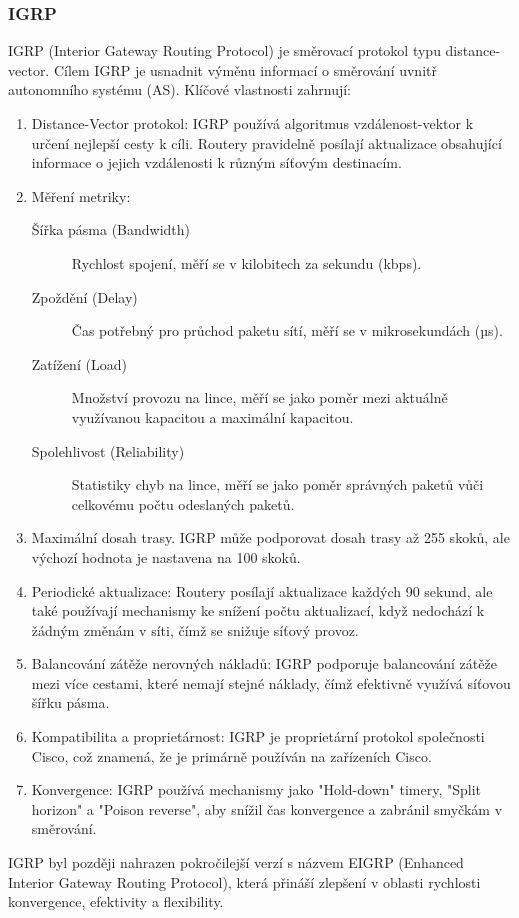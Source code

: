 \subsubsection{IGRP} 
IGRP (Interior Gateway Routing Protocol) je směrovací protokol typu distance-vector. Cílem IGRP je usnadnit výměnu informací o směrování uvnitř autonomního systému (AS). Klíčové vlastnosti zahrnují:
\begin{enumerate}
    \item Distance-Vector protokol: IGRP používá algoritmus vzdálenost-vektor k určení nejlepší cesty k cíli. Routery pravidelně posílají aktualizace obsahující informace o jejich vzdálenosti k různým síťovým destinacím.
    \item Měření metriky:\begin{description}
        \item[Šířka pásma (Bandwidth)] Rychlost spojení, měří se v kilobitech za sekundu (kbps).
        \item[Zpoždění (Delay)] Čas potřebný pro průchod paketu sítí, měří se v mikrosekundách (µs).
        \item[Zatížení (Load)] Množství provozu na lince, měří se jako poměr mezi aktuálně využívanou kapacitou a maximální kapacitou.
        \item[Spolehlivost (Reliability)] Statistiky chyb na lince, měří se jako poměr správných paketů vůči celkovému počtu odeslaných paketů.
    \end{description}
    \item Maximální dosah trasy. IGRP může podporovat dosah trasy až 255 skoků, ale výchozí hodnota je nastavena na 100 skoků.
    \item Periodické aktualizace: Routery posílají aktualizace každých 90 sekund, ale také používají mechanismy ke snížení počtu aktualizací, když nedochází k žádným změnám v síti, čímž se snižuje síťový provoz.
    \item Balancování zátěže nerovných nákladů: IGRP podporuje balancování zátěže mezi více cestami, které nemají stejné náklady, čímž efektivně využívá síťovou šířku pásma.
    \item Kompatibilita a proprietárnost: IGRP je proprietární protokol společnosti Cisco, což znamená, že je primárně používán na zařízeních Cisco.
    \item Konvergence: IGRP používá mechanismy jako "Hold-down" timery, "Split horizon" a "Poison reverse", aby snížil čas konvergence a zabránil smyčkám v směrování.
\end{enumerate}
IGRP byl později nahrazen pokročilejší verzí s názvem EIGRP (Enhanced Interior Gateway Routing Protocol), která přináší zlepšení v oblasti rychlosti konvergence, efektivity a flexibility.
